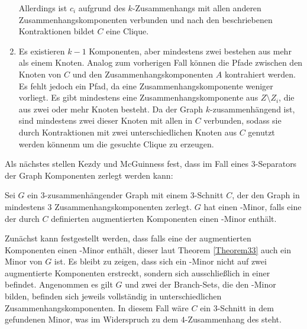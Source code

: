 \begin{beweis}
\begin{enumerate}
          Allerdings ist $c_i$ aufgrund des $k$-Zusammenhangs mit allen anderen Zusammenhangskomponenten verbunden und nach den beschriebenen Kontraktionen bildet $C$ eine Clique.
    \item Es existieren $k-1$ Komponenten, aber mindestens zwei bestehen aus mehr als einem Knoten.
          Analog zum vorherigen Fall können die Pfade zwischen den Knoten von $C$ und den Zusammenhangskomponenten $A$ kontrahiert werden.
          Es fehlt jedoch ein Pfad, da eine Zusammenhangskomponente weniger vorliegt.
          Es gibt mindestens eine Zusammenhangskomponente aus $Z \setminus Z_i$, die aus zwei oder mehr Knoten besteht.
          Da der Graph $k$-zusammenhängend ist, sind mindestens zwei dieser Knoten mit allen in $C$ verbunden, sodass sie durch Kontraktionen mit zwei unterschiedlichen Knoten aus $C$ genutzt werden könnenm um die gesuchte Clique zu erzeugen.
  \end{enumerate}
\end{beweis}

Als nächstes stellen Kezdy und McGuinness fest, dass im Fall eines $3$-Separators der Graph Komponenten zerlegt werden kann:
\begin{theorem}\label{Theorem34}
  Sei $G$ ein $3$-zusammenhängender Graph mit einem $3$-Schnitt $C$, der den Graph in mindestens $3$ Zusammenhangskomponenten zerlegt.
  $G$ hat einen \kf-Minor, falls eine der durch $C$ definierten augmentierten Komponenten einen \kf-Minor enthält.
\end{theorem}
\begin{beweis}
  Zunächst kann festgestellt werden, dass falls eine der augmentierten Komponenten einen \kf-Minor enthält, dieser laut Theorem \ref{Theorem33} auch ein Minor von $G$ ist.
  Es bleibt zu zeigen, dass sich ein \kf-Minor nicht auf zwei augmentierte Komponenten erstreckt, sondern sich ausschließlich in einer befindet.
  Angenommen es gilt \kf \minor $G$ und zwei der Branch-Sets, die den \kf-Minor bilden, befinden sich jeweils vollständig in unterschiedlichen Zusammenhangskomponenten.
  In diesem Fall wäre $C$ ein $3$-Schnitt in dem gefundenen Minor, was im Widerspruch zu dem $4$-Zusammenhang des \kf steht.
\end{beweis}

